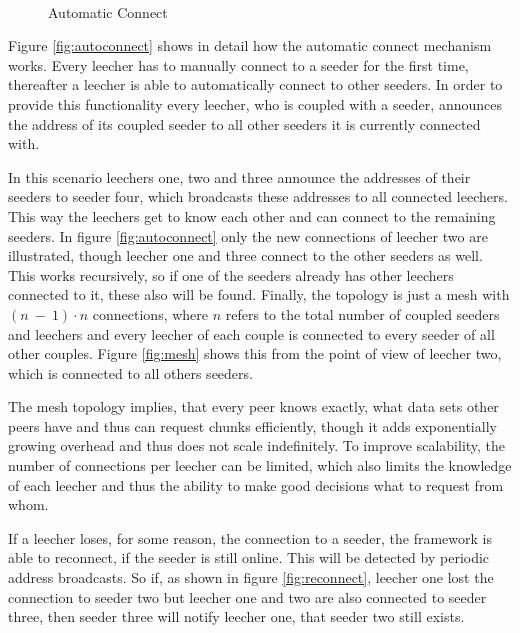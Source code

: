 \begin{figure}[ht]
	\begin{center}

		~ %

		\caption{Automatic Connect}
	\end{center}
\end{figure}


Figure \ref{fig:autoconnect} shows in detail how the automatic connect mechanism works. Every leecher has to manually connect to a seeder for the first time, thereafter a leecher is able to automatically connect to other seeders. In order to provide this functionality every leecher, who is coupled with a seeder, announces the address of its coupled seeder to all other seeders it is currently connected with.

In this scenario leechers one, two and three announce the addresses of their seeders to seeder four, which broadcasts these addresses to all connected leechers. This way the leechers get to know each other and can connect to the remaining seeders. In figure \ref{fig:autoconnect} only the new connections of leecher two are illustrated, though leecher one and three connect to the other seeders as well. This works recursively, so if one of the seeders already has other leechers connected to it, these also will be found. Finally, the topology is just a mesh with $(n\:-\:1)\cdot n$ connections, where $n$ refers to the total number of coupled seeders and leechers and every leecher of each couple is connected to every seeder of all other couples. Figure \ref{fig:mesh} shows this from the point of view of leecher two, which is connected to all others seeders.

The mesh topology implies, that every peer knows exactly, what data sets other peers have and thus can request chunks efficiently, though it adds exponentially growing overhead and thus does not scale indefinitely. To improve scalability, the number of connections per leecher can be limited, which also limits the knowledge of each leecher and thus the ability to make good decisions what to request from whom.

If a leecher loses, for some reason, the connection to a seeder, the framework is able to reconnect, if the seeder is still online. This will be detected by periodic address broadcasts. So if, as shown in figure \ref{fig:reconnect}, leecher one lost the connection to seeder two but leecher one and two are also connected to seeder three, then seeder three will notify leecher one, that seeder two still exists.


